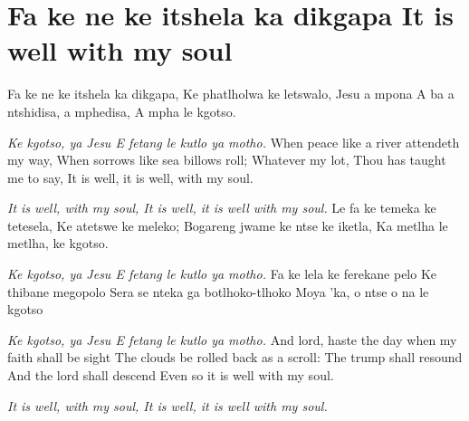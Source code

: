 \starttocol
\chapter{Fa ke ne ke itshela ka dikgapa
      It is well with my soul}
\nexttocol
\hfill{\it }
\stoptocol
\starttocol
\startlines
{\sc Fa} ke ne ke itshela ka dikgapa,
Ke phatlholwa ke letswalo,
Jesu a mpona
A ba a ntshidisa, a mphedisa,
A mpha le kgotso.

{\it
Ke kgotso, ya Jesu
E fetang le kutlo ya motho.}
\stoplines
\nexttocol
\stoptocol
\starttocol
\startlines
When peace like a river attendeth my way,
When sorrows like sea billows roll;
Whatever my lot,
Thou has taught me to say,
It is well, it is well, with my soul.

{\it
It is well, with my soul,
It is well, it is well with my soul.}
\stoplines
\nexttocol
\stoptocol
\starttocol
\startlines
Le fa ke temeka ke tetesela,
Ke atetswe ke meleko;
Bogareng jwame ke ntse ke iketla,
Ka metlha le metlha, ke kgotso.

{\it
Ke kgotso, ya Jesu
E fetang le kutlo ya motho.}
\stoplines
\nexttocol
\stoptocol
\starttocol
\startlines
Fa ke lela ke ferekane pelo
Ke thibane megopolo
Sera se nteka ga botlhoko-tlhoko
Moya 'ka, o ntse o na le kgotso

{\it
Ke kgotso, ya Jesu
E fetang le kutlo ya motho.}
\stoplines
\nexttocol
\stoptocol
\page
\startlines
And lord, haste the day when my faith shall be sight
The clouds be rolled back as a scroll:
The trump shall resound
And the lord shall descend
Even so it is well with my soul.

 {\it
It is well, with my soul,
It is well, it is well with my soul.}
\stoplines


